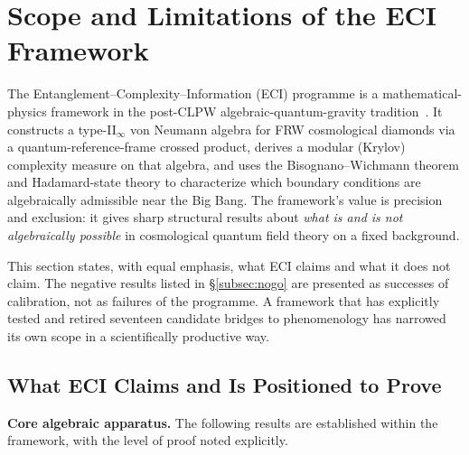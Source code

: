 %

\section{Scope and Limitations of the ECI Framework}
\label{sec:scope}

The Entanglement--Complexity--Information (ECI) programme is a
mathematical-physics framework in the post-CLPW algebraic-quantum-gravity
tradition~\cite{Chandrasekaran2023,Chandrasekaran2022}.
It constructs a type-II$_\infty$ von Neumann algebra for FRW cosmological
diamonds via a quantum-reference-frame crossed product, derives a modular
(Krylov) complexity measure on that algebra, and uses the Bisognano--Wichmann
theorem and Hadamard-state theory to characterize which boundary conditions
are algebraically admissible near the Big Bang.  The framework's value is
precision and exclusion: it gives sharp structural results about
\emph{what is and is not algebraically possible} in cosmological quantum
field theory on a fixed background.

This section states, with equal emphasis, what ECI claims and what it does
not claim.  The negative results listed in \S\ref{subsec:nogo} are presented
as successes of calibration, not as failures of the programme.  A framework
that has explicitly tested and retired seventeen candidate bridges to
phenomenology has narrowed its own scope in a scientifically productive way.

\subsection{What ECI Claims and Is Positioned to Prove}
\label{subsec:claims}

\textbf{Core algebraic apparatus.}  The following results are established
within the framework, with the level of proof noted explicitly.

